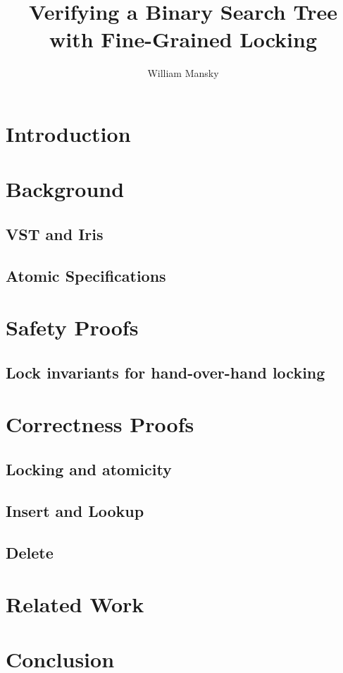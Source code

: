 \documentclass[11pt]{article} %
\title{Verifying a Binary Search Tree with Fine-Grained Locking }
\author{William Mansky}
\date{} %
\begin{document}
\maketitle

\section{Introduction}

\section{Background}
\subsection{VST and Iris}
\subsection{Atomic Specifications}

\section{Safety Proofs}
\subsection{Lock invariants for hand-over-hand locking}

\section{Correctness Proofs}
\subsection{Locking and atomicity} 
\subsection{Insert and Lookup}
\subsection{Delete}

\section{Related Work}
\section{Conclusion}
\end{document}
